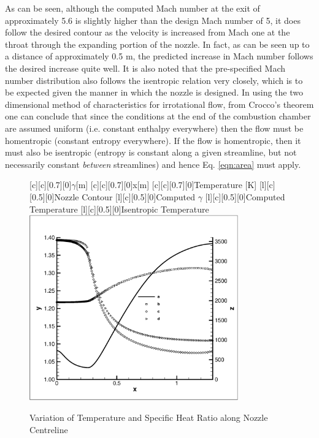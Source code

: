 	As can be seen, although the computed Mach number at the exit of approximately 5.6 is slightly higher 
than the design Mach number of 5, it does follow the desired contour as the velocity is increased from 
Mach one at the throat through the expanding portion of the nozzle.  In fact, as can be seen up to a  
distance of approximately 0.5 m, the predicted increase in Mach number follows the desired increase 
quite well.  It is also noted that the pre-specified Mach number distribution also follows the isentropic
relation very closely, which is to be expected given the manner in which the nozzle is designed.  In using
the two dimensional method of characteristics for irrotational flow, from Crocco's theorem one can conclude
that since the conditions at the end of the combustion chamber are assumed uniform (i.e. constant enthalpy
everywhere) then the flow must be homentropic (constant entropy everywhere).  If the flow is homentropic, then
it must also be isentropic (entropy is constant along a given streamline, but not necessarily constant 
\emph{between} streamlines) and hence Eq. \ref{eqn:area} must apply.

\begin{figure}[p]
\begin{center}
[c][c][0.7][0]{$\gamma$[m]}
[c][c][0.7][0]{x[m]}
[c][c][0.7][0]{Temperature [K]}
[l][c][0.5][0]{Nozzle Contour}
[l][c][0.5][0]{Computed $\gamma$}
[l][c][0.5][0]{Computed Temperature}
[l][c][0.5][0]{Isentropic Temperature}
\includegraphics[width=9cm]{warpgamma.eps}
\caption{Variation of Temperature and Specific Heat Ratio along Nozzle Centreline}
\label{fig:warpgamma}
\end{center}
\end{figure}

